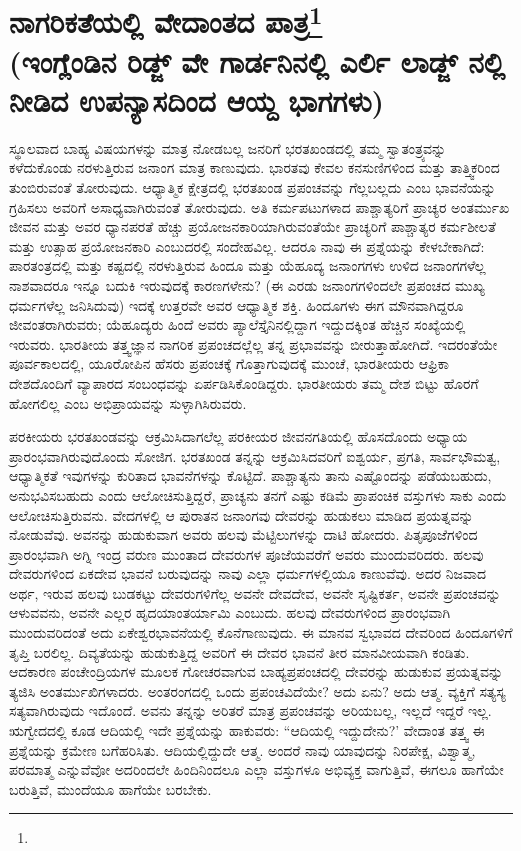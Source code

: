 
\chapter{ನಾಗರಿಕತೆಯಲ್ಲಿ ವೇದಾಂತದ ಪಾತ್ರ\protect\footnote{}\\(ಇಂಗ್ಲೆಂಡಿನ ರಿಡ್ಜ್ ವೇ ಗಾರ್ಡನಿನಲ್ಲಿ ಎರ್ಲಿ ಲಾಡ್ಜ್ ನಲ್ಲಿ ನೀಡಿದ ಉಪನ್ಯಾಸದಿಂದ ಆಯ್ದ ಭಾಗಗಳು)}

ಸ್ಥೂಲವಾದ ಬಾಹ್ಯ ವಿಷಯಗಳನ್ನು ಮಾತ್ರ ನೋಡಬಲ್ಲ ಜನರಿಗೆ ಭರತಖಂಡದಲ್ಲಿ ತಮ್ಮ ಸ್ವಾತಂತ್ರ್ಯವನ್ನು ಕಳೆದುಕೊಂಡು ನರಳುತ್ತಿರುವ ಜನಾಂಗ ಮಾತ್ರ ಕಾಣುವುದು. ಭಾರತವು ಕೇವಲ ಕನಸುಣಿಗಳಿಂದ ಮತ್ತು ತಾತ್ತ್ವಿಕರಿಂದ ತುಂಬಿರುವಂತೆ ತೋರುವುದು. ಆಧ್ಯಾತ್ಮಿಕ ಕ್ಷೇತ್ರದಲ್ಲಿ ಭರತಖಂಡ ಪ್ರಪಂಚವನ್ನು ಗೆಲ್ಲಬಲ್ಲದು ಎಂಬ ಭಾವನೆಯನ್ನು ಗ್ರಹಿಸಲು ಅವರಿಗೆ ಅಸಾಧ್ಯವಾಗಿರುವಂತೆ ತೋರುವುದು. ಅತಿ ಕರ್ಮಪಟುಗಳಾದ ಪಾಶ್ಚಾತ್ಯರಿಗೆ ಪ್ರಾಚ್ಯರ ಅಂತರ್ಮುಖ ಜೀವನ ಮತ್ತು ಅವರ ಧ್ಯಾನಪರತೆ ಹೆಚ್ಚು ಪ್ರಯೋಜನಕಾರಿಯಾಗಿರುವಂತೆಯೇ ಪ್ರಾಚ್ಯರಿಗೆ ಪಾಶ್ಚಾತ್ಯರ ಕರ್ಮಶೀಲತೆ ಮತ್ತು ಉತ್ಸಾಹ ಪ್ರಯೋಜನಕಾರಿ ಎಂಬುದರಲ್ಲಿ ಸಂದೇಹವಿಲ್ಲ. ಆದರೂ ನಾವು ಈ ಪ್ರಶ್ನೆಯನ್ನು ಕೇಳಬೇಕಾಗಿದೆ: ಪಾರತಂತ್ರದಲ್ಲಿ ಮತ್ತು ಕಷ್ಟದಲ್ಲಿ ನರಳುತ್ತಿರುವ ಹಿಂದೂ ಮತ್ತು ಯೆಹೂದ್ಯ ಜನಾಂಗಗಳು ಉಳಿದ ಜನಾಂಗಗಳೆಲ್ಲ ನಾಶವಾದರೂ ಇನ್ನೂ ಬದುಕಿ ಇರುವುದಕ್ಕೆ ಕಾರಣಗಳೇನು? (ಈ ಎರಡು ಜನಾಂಗಗಳಿಂದಲೇ ಪ್ರಪಂಚದ ಮುಖ್ಯ ಧರ್ಮಗಳೆಲ್ಲ ಜನಿಸಿದುವು) ಇದಕ್ಕೆ ಉತ್ತರವೇ ಅವರ ಆಧ್ಯಾತ್ಮಿಕ ಶಕ್ತಿ. ಹಿಂದೂಗಳು ಈಗ ಮೌನವಾಗಿದ್ದರೂ ಜೀವಂತರಾಗಿರುವರು; ಯೆಹೂದ್ಯರು ಹಿಂದೆ ಅವರು ಪ್ಯಾಲೆಸ್ತೈನಿನಲ್ಲಿದ್ದಾಗ ಇದ್ದುದಕ್ಕಿಂತ ಹೆಚ್ಚಿನ ಸಂಖ್ಯೆಯಲ್ಲಿ ಇರುವರು. ಭಾರತೀಯ ತತ್ತ್ವಜ್ಞಾನ ನಾಗರಿಕ ಪ್ರಪಂಚದಲ್ಲೆಲ್ಲ ತನ್ನ ಪ್ರಭಾವವನ್ನು ಬೀರುತ್ತಾಹೋಗಿದೆ. ಇದರಂತೆಯೇ ಪೂರ್ವಕಾಲದಲ್ಲಿ, ಯೂರೋಪಿನ ಹೆಸರು ಪ್ರಪಂಚಕ್ಕೆ ಗೊತ್ತಾಗುವುದಕ್ಕೆ ಮುಂಚೆ, ಭಾರತೀಯರು ಆಫ್ರಿಕಾ ದೇಶದೊಂದಿಗೆ ವ್ಯಾಪಾರದ ಸಂಬಂಧವನ್ನು ಏರ್ಪಡಿಸಿಕೊಂಡಿದ್ದರು. ಭಾರತೀಯರು ತಮ್ಮ ದೇಶ ಬಿಟ್ಟು ಹೊರಗೆ ಹೋಗಲಿಲ್ಲ ಎಂಬ ಅಭಿಪ್ರಾಯವನ್ನು ಸುಳ್ಳಾಗಿಸಿರುವರು.

ಪರಕೀಯರು ಭರತಖಂಡವನ್ನು ಆಕ್ರಮಿಸಿದಾಗಲೆಲ್ಲ ಪರಕೀಯರ ಜೀವನಗತಿಯಲ್ಲಿ ಹೊಸದೊಂದು ಅಧ್ಯಾಯ ಪ್ರಾರಂಭವಾಗಿರುವುದೊಂದು ಸೋಜಿಗ. ಭರತಖಂಡ ತನ್ನನ್ನು ಆಕ್ರಮಿಸಿದವರಿಗೆ ಐಶ್ವರ್ಯ, ಪ್ರಗತಿ, ಸಾರ್ವಭೌಮತ್ವ, ಆಧ್ಯಾತ್ಮಿಕತೆ ಇವುಗಳನ್ನು ಕುರಿತಾದ ಭಾವನೆಗಳನ್ನು ಕೊಟ್ಟಿದೆ. ಪಾಶ್ಚಾತ್ಯನು ತಾನು ಎಷ್ಟೊಂದನ್ನು ಪಡೆಯಬಹುದು, ಅನುಭವಿಸಬಹುದು ಎಂದು ಆಲೋಚಿಸುತ್ತಿದ್ದರೆ, ಪ್ರಾಚ್ಯನು ತನಗೆ ಎಷ್ಟು ಕಡಿಮೆ ಪ್ರಾಪಂಚಿಕ ವಸ್ತುಗಳು ಸಾಕು ಎಂದು ಆಲೋಚಿಸುತ್ತಿರುವನು. ವೇದಗಳಲ್ಲಿ ಆ ಪುರಾತನ ಜನಾಂಗವು ದೇವರನ್ನು ಹುಡುಕಲು ಮಾಡಿದ ಪ್ರಯತ್ನವನ್ನು ನೋಡುವೆವು. ಅವನನ್ನು ಹುಡುಕುವಾಗ ಅವರು ಹಲವು ಮೆಟ್ಟಿಲುಗಳನ್ನು ದಾಟಿ ಹೋದರು. ಪಿತೃಪೂಜೆಗಳಿಂದ ಪ್ರಾರಂಭವಾಗಿ ಅಗ್ನಿ ಇಂದ್ರ ವರುಣ ಮುಂತಾದ ದೇವರುಗಳ ಪೂಜೆಯವರೆಗೆ ಅವರು ಮುಂದುವರಿದರು. ಹಲವು ದೇವರುಗಳಿಂದ ಏಕದೇವ ಭಾವನೆ ಬರುವುದನ್ನು ನಾವು ಎಲ್ಲಾ ಧರ್ಮಗಳಲ್ಲಿಯೂ ಕಾಣುವೆವು. ಅದರ ನಿಜವಾದ ಅರ್ಥ, ಇರುವ ಹಲವು ಬುಡಕಟ್ಟು ದೇವರುಗಳಿಗೆಲ್ಲ ಅವನೇ ದೇವದೇವ, ಅವನೇ ಸೃಷ್ಟಿಕರ್ತ, ಅವನೇ ಪ್ರಪಂಚವನ್ನು ಆಳುವವನು, ಅವನೇ ಎಲ್ಲರ ಹೃದಯಾಂತರ್ಯಾಮಿ ಎಂಬುದು. ಹಲವು ದೇವರುಗಳಿಂದ ಪ್ರಾರಂಭವಾಗಿ ಮುಂದುವರಿದಂತೆ ಅದು ಏಕೇಶ್ವರಭಾವನೆಯಲ್ಲಿ ಕೊನೆಗಾಣುವುದು. ಈ ಮಾನವ ಸ್ವಭಾವದ ದೇವರಿಂದ ಹಿಂದೂಗಳಿಗೆ ತೃಪ್ತಿ ಬರಲಿಲ್ಲ. ದಿವ್ಯತೆಯನ್ನು ಹುಡುಕುತ್ತಿದ್ದ ಅವರಿಗೆ ಈ ದೇವರ ಭಾವನೆ ತೀರ ಮಾನವೀಯವಾಗಿ ಕಂಡಿತು. ಆದಕಾರಣ ಪಂಚೇಂದ್ರಿಯಗಳ ಮೂಲಕ ಗೋಚರವಾಗುವ ಬಾಹ್ಯಪ್ರಪಂಚದಲ್ಲಿ ದೇವರನ್ನು ಹುಡುಕುವ ಪ್ರಯತ್ನವನ್ನು ತ್ಯಜಿಸಿ ಅಂತರ್ಮುಖಿಗಳಾದರು. ಅಂತರಂಗದಲ್ಲಿ ಒಂದು ಪ್ರಪಂಚವಿದೆಯೇ? ಅದು ಏನು? ಅದು ಆತ್ಮ. ವ್ಯಕ್ತಿಗೆ ಸತ್ಯಸ್ಯ ಸತ್ಯವಾಗಿರುವುದು ಇದೊಂದೆ. ಅವನು ತನ್ನನ್ನು ಅರಿತರೆ ಮಾತ್ರ ಪ್ರಪಂಚವನ್ನು ಅರಿಯಬಲ್ಲ, ಇಲ್ಲದೆ ಇದ್ದರೆ ಇಲ್ಲ. ಋಗ್ವೇದದಲ್ಲಿ ಕೂಡ ಆದಿಯಲ್ಲಿ ಇದೇ ಪ್ರಶ್ನೆಯನ್ನು ಹಾಕುವರು: “ಆದಿಯಲ್ಲಿ ಇದ್ದುದೇನು?' ವೇದಾಂತ ತತ್ತ್ವ ಈ ಪ್ರಶ್ನೆಯನ್ನು ಕ್ರಮೇಣ ಬಗೆಹರಿಸಿತು. ಆದಿಯಲ್ಲಿದ್ದುದೇ ಆತ್ಮ. ಅಂದರೆ ನಾವು ಯಾವುದನ್ನು ನಿರಪೇಕ್ಷ, ವಿಶ್ವಾತ್ಮ, ಪರಮಾತ್ಮ ಎನ್ನುವೆವೋ ಅದರಿಂದಲೇ ಹಿಂದಿನಿಂದಲೂ ಎಲ್ಲಾ ವಸ್ತುಗಳೂ ಅಭಿವ್ಯಕ್ತ ವಾಗುತ್ತಿವೆ, ಈಗಲೂ ಹಾಗೆಯೇ ಬರುತ್ತಿವೆ, ಮುಂದೆಯೂ ಹಾಗೆಯೇ ಬರಬೇಕು.

